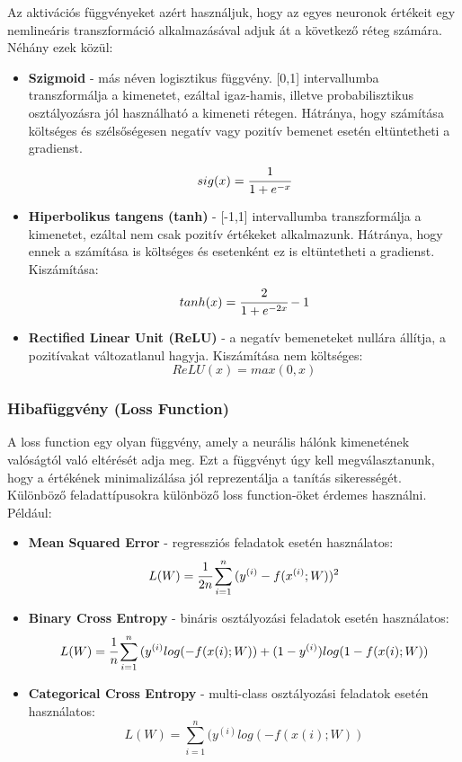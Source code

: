 Az aktivációs függvényeket azért használjuk, hogy az egyes neuronok értékeit egy nemlineáris transzformáció alkalmazásával adjuk át a következő réteg számára. Néhány ezek közül:
\begin{itemize}
 \item \textbf{Szigmoid} - más néven logisztikus függvény. [0,1] intervallumba transzformálja a kimenetet, ezáltal igaz-hamis, illetve probabilisztikus osztályozásra jól használható a kimeneti rétegen. Hátránya, hogy számítása költséges és szélsőségesen negatív vagy pozitív bemenet esetén eltüntetheti a gradienst.
\begin{equation}
	sig(x) = \cfrac{1}{1+e^{-x}}
\end{equation}
 \item \textbf{Hiperbolikus tangens (tanh)} - [-1,1] intervallumba transzformálja a kimenetet, ezáltal nem csak pozitív értékeket alkalmazunk. Hátránya, hogy ennek a számítása is költséges és esetenként ez is eltüntetheti a gradienst. Kiszámítása:
\begin{equation}
	tanh(x) = \cfrac{2}{1+e^{-2x}} - 1
\end{equation}
 \item \textbf{Rectified Linear Unit (ReLU)} - a negatív bemeneteket nullára állítja, a pozitívakat változatlanul hagyja. Kiszámítása nem költséges: \cite{deeplearningbook}
\begin{equation}
	ReLU(x) = max(0, x)
\end{equation}
 \end{itemize}

\subsubsection{Hibafüggvény (Loss Function)}

A loss function egy olyan függvény, amely a neurális hálónk kimenetének valóságtól való eltérését adja meg. Ezt a függvényt úgy kell megválasztanunk, hogy a értékének minimalizálása jól reprezentálja a tanítás sikerességét. Különböző feladattípusokra különböző loss function-öket érdemes használni. Például:
\begin{itemize}
 \item \textbf{Mean Squared Error} - regressziós feladatok esetén használatos:
\begin{equation}
	L(W) = \cfrac{1}{2n}\sum_{i=1}^{n}{(y^{(i)}-f(x^{(i)};W))^2}
\end{equation}
 \item \textbf{Binary Cross Entropy} - bináris osztályozási feladatok esetén használatos:
\begin{equation}
	L(W) = \cfrac{1}{n}\sum_{i=1}^{n}{(y^{(i)}log(-f(x{(i)};W))+(1-y^{(i)})log(1-f(x{(i)};W))}
\end{equation}
 \item \textbf{Categorical Cross Entropy} - multi-class osztályozási feladatok esetén használatos: \cite{deeplearningbook}
\begin{equation}
	L(W) = \sum_{i=1}^{n}{(y^{(i)}log(-f(x{(i)};W))}
\end{equation}
 \end{itemize}

